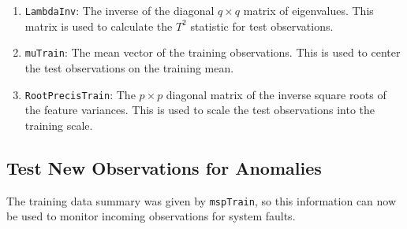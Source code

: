 \documentclass{report}\usepackage[]{graphicx}\usepackage[]{color}
\begin{document}
\begin{enumerate}
\begin{enumerate}
    \item \texttt{LambdaInv}: The inverse of the diagonal $q \times q$ matrix of eigenvalues. This matrix is used to calculate the $T^2$ statistic for test observations.
    \item \texttt{muTrain}: The mean vector of the training observations. This is used to center the test observations on the training mean.
    \item \texttt{RootPrecisTrain}: The $p \times p$ diagonal matrix of the inverse square roots of the feature variances. This is used to scale the test observations into the training scale.
	\end{enumerate}
\end{enumerate}


\subsection{Test New Observations for Anomalies}
The training data summary was given by \texttt{mspTrain}, so this information can now be used to monitor incoming observations for system faults.
\end{document}
